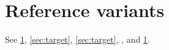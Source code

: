 \section{Reference variants}
\label{sec:target}
See \ref{sec:target}, \eqref{sec:target}, \autoref{sec:target},
\pageref{sec:target}, and \cref{sec:target}.
